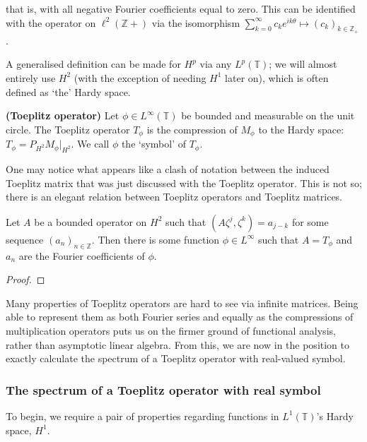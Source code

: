 \documentclass[../main.tex]{subfiles}
\begin{document}
that is, with all negative Fourier coefficients equal to zero. This can be identified with the operator on $\ell^2(\mathbb{Z}+)$ via the isomorphism $\sum_{k=0}^\infty c_k e^{i k \theta} \mapsto (c_k)_{k \in \mathbb{Z}_+}$ \parencite{bottcher1990analysis}.

 A generalised definition can be made for $H^p$ via any $L^p(\mathbb{T})$; we will almost entirely use $H^2$ (with the exception of needing $H^1$ later on), which is often defined as `the' Hardy space.

\begin{definition}{\textbf{(Toeplitz operator)}}
Let $\phi \in L^{\infty}(\mathbb{T})$ be bounded and measurable on the unit circle. The Toeplitz operator $T_\phi$ is the compression of $M_\phi$ 
to the Hardy space: $T_{\phi} = P_{H^2} M_\phi \big|_{H^2}$. We call $\phi$ the `symbol' of $T_\phi$.
\end{definition}

One may notice what appears like a clash of notation between the induced Toeplitz matrix that was just discussed with the Toeplitz operator. This is not
so; there is an elegant relation between Toeplitz operators and Toeplitz matrices.

\begin{theorem}
Let $A$ be a bounded operator on $H^2$ such that $(A \zeta^j, \zeta^k) = a_{j-k}$ for some sequence $(a_n)_{n \in \mathbb{Z}}$. Then there is
some function $\phi \in L^\infty$ such that $A = T_\phi$ and $a_n$ are the Fourier coefficients of $\phi$.
\end{theorem}
\begin{proof}
\end{proof}

Many properties of Toeplitz operators are hard to see via infinite matrices. Being able to represent them as both Fourier series and equally as the  
compressions of multiplication operators puts us on the firmer ground of functional analysis, rather than asymptotic linear algebra. From this, we
are now in the position to exactly calculate the spectrum of a Toeplitz operator with real-valued symbol.

\subsubsection{The spectrum of a Toeplitz operator with real symbol}

To begin, we require a pair of properties regarding functions in $L^1(\mathbb{T})$'s Hardy space, $H^1$. 
\end{document}
